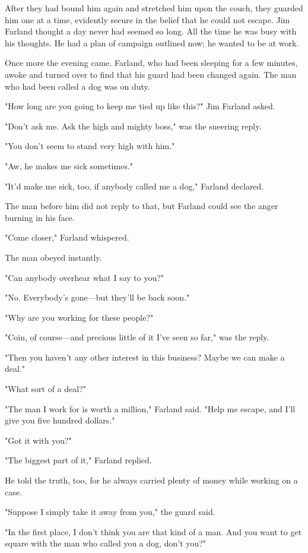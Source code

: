 \documentclass{novel}
\begin{document}
After they had bound him again and stretched him upon the couch, they guarded him one at a time, evidently secure in the belief that he could not escape. Jim Farland thought a day never had seemed so long. All the time he was busy with his thoughts. He had a plan of campaign outlined now; he wanted to be at work.

Once more the evening came. Farland, who had been sleeping for a few minutes, awoke and turned over to find that his guard had been changed again. The man who had been called a dog was on duty.

"How long are you going to keep me tied up like this?" Jim Farland asked.

"Don't ask me. Ask the high and mighty boss," was the sneering reply.

"You don't seem to stand very high with him."

"Aw, he makes me sick sometimes."

"It'd make me sick, too, if anybody called me a dog," Farland declared.

The man before him did not reply to that, but Farland could see the anger burning in his face.

"Come closer," Farland whispered.

The man obeyed instantly.

"Can anybody overhear what I say to you?"

"No. Everybody's gone---but they'll be back soon."

"Why are you working for these people?"

"Coin, of course---and precious little of it I've seen so far," was the reply.

"Then you haven't any other interest in this business? Maybe we can make a deal."

"What sort of a deal?"

"The man I work for is worth a million," Farland said. "Help me escape, and I'll give you five hundred dollars."

"Got it with you?"

"The biggest part of it," Farland replied.

He told the truth, too, for he always carried plenty of money while working on a case.

"Suppose I simply take it away from you," the guard said.

"In the first place, I don't think you are that kind of a man. And you want to get square with the man who called you a dog, don't you?"
\end{document}
